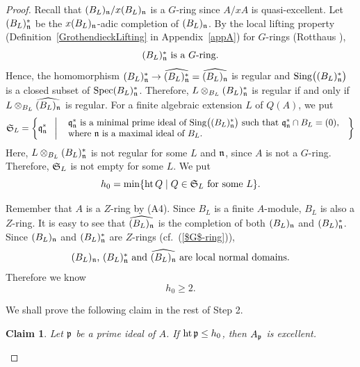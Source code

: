 \documentclass[11pt,a4paper]{amsart}
\newtheorem{claim}[theorem]{Claim}
\theoremstyle{definition}
\theoremstyle{remark}
\newcommand{\Spec}{\operatorname{Spec}}
\newcommand{\Ht}{\operatorname{ht}}
\newcommand{\fp}{\frak{p}}
\newcommand{\fq}{\frak{q}}
\newcommand{\fn}{\frak{n}}
\newcommand{\fS}{\frak{S}}
\begin{document}
\begin{proof}
Recall that $(B_L)_\fn/x (B_L)_\fn$ is a $G$-ring since $A/xA$ is quasi-excellent.
Let $(B_L)_\fn^*$ be the $x(B_L)_\fn$-adic completion of $(B_L)_\fn$.
By the local lifting property (Definition~\ref{GrothendieckLifting} in Appendix~\ref{appA}) for $G$-rings (Rotthaus \cite{Rott79}),
\begin{equation}\label{$G$-ring}
\mbox{$(B_L)_\fn^*$ is a $G$-ring.}
\end{equation}
Hence, the homomorphism $(B_L)_\fn^* \rightarrow \widehat{(B_L)_\fn^*} = \widehat{(B_L)_\fn}$
is regular and ${\rm Sing}\big((B_L)_\fn^*\big)$ is a closed subset of $\Spec (B_L)_\fn^*$. Therefore, $L \otimes_{B_L}(B_L)_\fn^*$ is regular if and only if
 $L \otimes_{B_L}\widehat{(B_L)_\fn}$ is regular.
For a finite algebraic extension $L$ of $Q(A)$, we put 
\[
\fS_L =
\left\{ \fq_{\fn}^* \ \ \left| \ \
\begin{array}{l}
\mbox{$\fq_{\fn}^*$ is a minimal prime ideal of  ${\rm Sing}\big((B_L)_\fn^*\big)$
such that $\fq_{\fn}^* \cap B_L = (0)$, } \\
\mbox{where $\fn$ is a maximal ideal  of $B_L$. } \\
\end{array}
\right.
\right\}
\]
Here, $L \otimes_{B_L}(B_L)_\fn^*$ is not regular for some $L$ and $\fn$, since $A$ is not a $G$-ring.
Therefore, $\fS_L$ is not empty for some $L$.
We put 
\begin{equation}\label{h_0}
h_0 = \min\{ \Ht Q \mid \mbox{$Q \in \fS_L$ for some $L$} \} .
\end{equation}

Remember that $A$ is a $Z$-ring by (A4).
Since $B_L$ is a finite $A$-module, $B_L$ is also a $Z$-ring. It is easy to see that $\widehat{(B_L)_\fn}$ is the completion of both 
$(B_L)_\fn$ and $(B_L)_\fn^*$.
Since $(B_L)_\fn$ and  $(B_L)_\fn^*$ are $Z$-rings (cf.\ (\ref{$G$-ring})),
\begin{equation}\label{normal}
\mbox{$(B_L)_\fn$, $(B_L)_\fn^*$ and $\widehat{(B_L)_\fn}$ are 
 local normal domains.}
\end{equation}
Therefore we know 
\begin{equation}\label{h_0 ge 2}
h_0 \ge 2 .
\end{equation}

We shall prove the following claim in the rest of Step 2.

\begin{claim}\label{ex}
Let $\fp$ be a prime ideal of $A$.
If $\Ht \fp \le h_0$, then $A_\fp$ is excellent.
\end{claim}


\end{proof}
\end{document}
